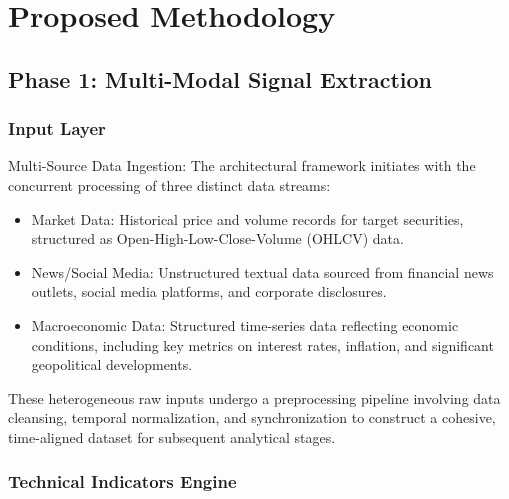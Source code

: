 \documentclass{singlecol-new}
\theoremstyle{TH}{
\newtheorem{lemma}{Lemma}
\newtheorem{theorem}[lemma]{Theorem}
\newtheorem{corrolary}[lemma]{Corrolary}
\newtheorem{conjecture}[lemma]{Conjecture}
\newtheorem{proposition}[lemma]{Proposition}
\newtheorem{claim}[lemma]{Claim}
\newtheorem{stheorem}[lemma]{Wrong Theorem}
\newtheorem{algorithm}{Algorithm}
}
\theoremstyle{THrm}{
\newtheorem{definition}{Definition}[section]
\newtheorem{question}{Question}[section]
\newtheorem{remark}{Remark}
\newtheorem{scheme}{Scheme}
}
\theoremstyle{THhit}{
\newtheorem{case}{Case}[section]
}
\begin{document}
\section{Proposed Methodology} 





\subsection{Phase 1: Multi-Modal Signal Extraction}

\subsubsection{Input Layer}
Multi-Source Data Ingestion: The architectural framework initiates with the concurrent processing of three distinct data streams:
\begin{itemize}
    \item Market Data: Historical price and volume records for target securities, structured as Open-High-Low-Close-Volume (OHLCV) data.
    \item News/Social Media: Unstructured textual data sourced from financial news outlets, social media platforms, and corporate disclosures.
    \item Macroeconomic Data: Structured time-series data reflecting economic conditions, including key metrics on interest rates, inflation, and significant geopolitical developments.
\end{itemize}

These heterogeneous raw inputs undergo a preprocessing pipeline involving data cleansing, temporal normalization, and synchronization to construct a cohesive, time-aligned dataset for subsequent analytical stages.

\subsubsection{Technical Indicators Engine}
\end{document}
